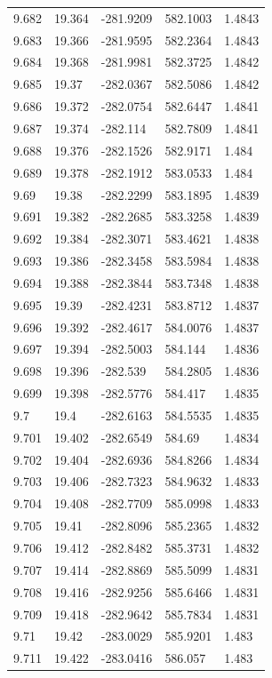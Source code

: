 \begin{tabular}{lllll}
9.682 & 19.364 & -281.9209 & 582.1003 & 1.4843 \\
9.683 & 19.366 & -281.9595 & 582.2364 & 1.4843 \\
9.684 & 19.368 & -281.9981 & 582.3725 & 1.4842 \\
9.685 & 19.37 & -282.0367 & 582.5086 & 1.4842 \\
9.686 & 19.372 & -282.0754 & 582.6447 & 1.4841 \\
9.687 & 19.374 & -282.114 & 582.7809 & 1.4841 \\
9.688 & 19.376 & -282.1526 & 582.9171 & 1.484 \\
9.689 & 19.378 & -282.1912 & 583.0533 & 1.484 \\
9.69 & 19.38 & -282.2299 & 583.1895 & 1.4839 \\
9.691 & 19.382 & -282.2685 & 583.3258 & 1.4839 \\
9.692 & 19.384 & -282.3071 & 583.4621 & 1.4838 \\
9.693 & 19.386 & -282.3458 & 583.5984 & 1.4838 \\
9.694 & 19.388 & -282.3844 & 583.7348 & 1.4838 \\
9.695 & 19.39 & -282.4231 & 583.8712 & 1.4837 \\
9.696 & 19.392 & -282.4617 & 584.0076 & 1.4837 \\
9.697 & 19.394 & -282.5003 & 584.144 & 1.4836 \\
9.698 & 19.396 & -282.539 & 584.2805 & 1.4836 \\
9.699 & 19.398 & -282.5776 & 584.417 & 1.4835 \\
9.7 & 19.4 & -282.6163 & 584.5535 & 1.4835 \\
9.701 & 19.402 & -282.6549 & 584.69 & 1.4834 \\
9.702 & 19.404 & -282.6936 & 584.8266 & 1.4834 \\
9.703 & 19.406 & -282.7323 & 584.9632 & 1.4833 \\
9.704 & 19.408 & -282.7709 & 585.0998 & 1.4833 \\
9.705 & 19.41 & -282.8096 & 585.2365 & 1.4832 \\
9.706 & 19.412 & -282.8482 & 585.3731 & 1.4832 \\
9.707 & 19.414 & -282.8869 & 585.5099 & 1.4831 \\
9.708 & 19.416 & -282.9256 & 585.6466 & 1.4831 \\
9.709 & 19.418 & -282.9642 & 585.7834 & 1.4831 \\
9.71 & 19.42 & -283.0029 & 585.9201 & 1.483 \\
9.711 & 19.422 & -283.0416 & 586.057 & 1.483 \\

\end{tabular}
